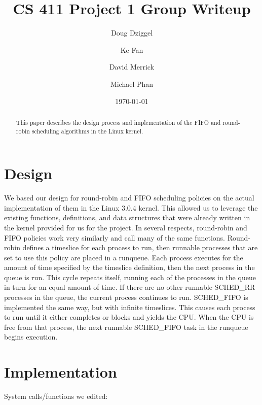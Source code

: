 \documentclass[letterpaper,10pt,titlepage]{article}
\begin{document}
\title{CS 411 Project 1 Group Writeup}
\author{Doug Dziggel \and Ke Fan \and David Merrick \and Michael Phan}
\date{\today}
\maketitle

\begin{abstract}
This paper describes the design process and implementation of the FIFO and round-robin scheduling algorithms in the Linux kernel.
\end{abstract}

\section{Design}

    We based our design for round-robin and FIFO scheduling policies on the actual implementation of them in the Linux 3.0.4 kernel. 
    This allowed us to leverage the existing functions, definitions, and data structures that were already written in the kernel 
    provided for us for the project. In several respects, round-robin and FIFO policies work very similarly and call many of the
    same functions. Round-robin defines a timeslice for each process to run, then runnable processes that are set to use this policy
    are placed in a runqueue. Each process executes for the amount of time specified by the timeslice definition, then the next process
    in the queue is run. This cycle repeats itself, running each of the processes in the queue in turn for an equal amount of time.
    If there are no other runnable SCHED\_RR processes in the queue, the current process continues to run. SCHED\_FIFO is implemented the
    same way, but with infinite timeslices. This causes each process to run until it either completes or blocks and yields the CPU. 
    When the CPU is free from that process, the next runnable SCHED\_FIFO task in the runqueue begins execution.

\section{Implementation}

System calls/functions we edited:\\
\end{document}
